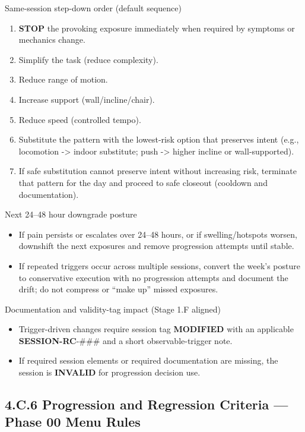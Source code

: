 \documentclass[10pt]{article}
\begin{document}
Same-session step-down order (default sequence)

\begin{enumerate}
\item \textbf{STOP} the provoking exposure immediately when required by symptoms or mechanics change.
\item Simplify the task (reduce complexity).
\item Reduce range of motion.
\item Increase support (wall/incline/chair).
\item Reduce speed (controlled tempo).
\item Substitute the pattern with the lowest-risk option that preserves intent (e.g., locomotion -> indoor substitute; push -> higher incline or wall-supported).
\item If safe substitution cannot preserve intent without increasing risk, terminate that pattern for the day and proceed to safe closeout (cooldown and documentation).
\end{enumerate}

Next 24–48 hour downgrade posture

\begin{itemize}
\item If pain persists or escalates over 24–48 hours, or if swelling/hotspots worsen, downshift the next exposures and remove progression attempts until stable.
\item If repeated triggers occur across multiple sessions, convert the week’s posture to conservative execution with no progression attempts and document the drift; do not compress or “make up” missed exposures.
\end{itemize}

Documentation and validity-tag impact (Stage 1.F aligned)

\begin{itemize}
\item Trigger-driven changes require session tag \textbf{MODIFIED} with an applicable \textbf{SESSION-RC}-\#\#\# and a short observable-trigger note.
\item If required session elements or required documentation are missing, the session is \textbf{INVALID} for progression decision use.
\end{itemize}

\subsection*{4.C.6 Progression and Regression Criteria — Phase 00 Menu Rules}
{}
\end{document}
